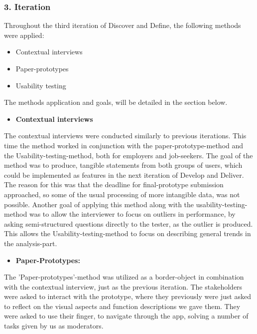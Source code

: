 \subsubsection{3. Iteration}

Throughout the third iteration of Discover and Define, the following methods were applied:
\begin{itemize}
    \item Contextual interviews
    \item Paper-prototypes
    \item Usability testing
\end{itemize}

The methods application and goals, will be detailed in the section below.

\begin{itemize}
    \item \bf{Contextual interviews}
\end{itemize}

The contextual interviews were conducted similarly to previous iterations. This time the method worked in conjunction with the paper-prototype-method and the Usability-testing-method, both for employers and job-seekers. The goal of the method was to produce, tangible statements from both groups of users, which could be implemented as features in the next iteration of Develop and Deliver. The reason for this was that the deadline for final-prototype submission approached, so some of the usual processing of more intangible data, was not possible. Another goal of applying this method along with the usability-testing-method was to allow the interviewer to focus on outliers in performance, by asking semi-structured questions directly to the tester, as the outlier is produced. This allows the Usability-testing-method to focus on describing general trends in the analysis-part. 

\begin{itemize}
    \item \bf{Paper-Prototypes:}
\end{itemize}

The 'Paper-prototypes'-method was utilized as a border-object in combination with the contextual interview, just as the previous iteration. The stakeholders were asked to interact with the prototype, where they previously were just asked to reflect on the visual aspects and function descriptions we gave them. They were asked to use their finger, to navigate through the app, solving a number of tasks given by us as moderators.

